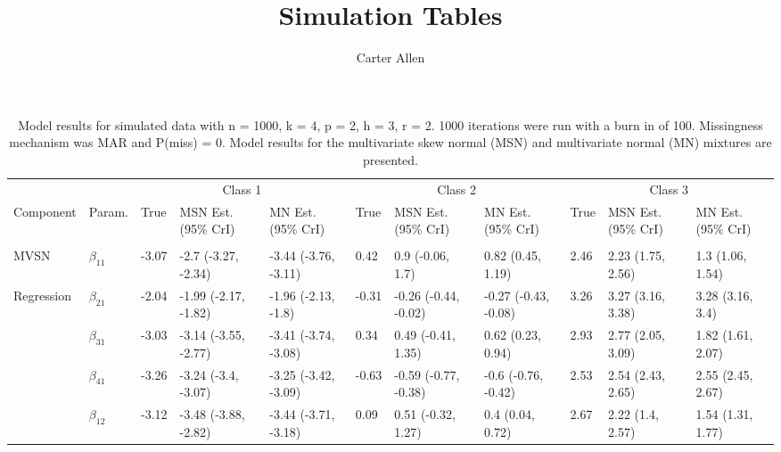\documentclass[]{article}
\title{Simulation Tables}
\author{Carter Allen}
\date{}
\begin{document}
\maketitle

\begin{landscape}\begin{table}[t]

\caption{\label{tab:unnamed-chunk-4}Model results for simulated data with n = 1000, k = 4, p = 2, h = 3, r = 2. 1000 iterations were run with a burn in of 100. Missingness mechanism was MAR and P(miss) = 0. Model results for the multivariate skew normal (MSN) and multivariate normal (MN) mixtures are presented.}
\centering
\fontsize{7}{9}\selectfont
\begin{tabular}{lllllllllll}
\toprule
\multicolumn{2}{c}{ } & \multicolumn{3}{c}{Class 1} & \multicolumn{3}{c}{Class 2} & \multicolumn{3}{c}{Class 3} \\
\cmidrule(l{3pt}r{3pt}){3-5} \cmidrule(l{3pt}r{3pt}){6-8} \cmidrule(l{3pt}r{3pt}){9-11}
Component & Param. & True & MSN Est. (95\% CrI) & MN Est. (95\% CrI)  & True & MSN Est. (95\% CrI) & MN Est. (95\% CrI) & True & MSN Est. (95\% CrI) & MN Est. (95\% CrI)\\
\midrule
\addlinespace[0.3em]
\multicolumn{11}{l}{\textbf{ }}\\
\hspace{1em}MVSN & $\beta_{11}$ & -3.07 & -2.7 (-3.27, -2.34) & -3.44 (-3.76, -3.11) & 0.42 & 0.9 (-0.06, 1.7) & 0.82 (0.45, 1.19) & 2.46 & 2.23 (1.75, 2.56) & 1.3 (1.06, 1.54)\\
\hspace{1em}Regression & $\beta_{21}$ & -2.04 & -1.99 (-2.17, -1.82) & -1.96 (-2.13, -1.8) & -0.31 & -0.26 (-0.44, -0.02) & -0.27 (-0.43, -0.08) & 3.26 & 3.27 (3.16, 3.38) & 3.28 (3.16, 3.4)\\
\hspace{1em} & $\beta_{31}$ & -3.03 & -3.14 (-3.55, -2.77) & -3.41 (-3.74, -3.08) & 0.34 & 0.49 (-0.41, 1.35) & 0.62 (0.23, 0.94) & 2.93 & 2.77 (2.05, 3.09) & 1.82 (1.61, 2.07)\\
\hspace{1em} & $\beta_{41}$ & -3.26 & -3.24 (-3.4, -3.07) & -3.25 (-3.42, -3.09) & -0.63 & -0.59 (-0.77, -0.38) & -0.6 (-0.76, -0.42) & 2.53 & 2.54 (2.43, 2.65) & 2.55 (2.45, 2.67)\\
\hspace{1em} & $\beta_{12}$ & -3.12 & -3.48 (-3.88, -2.82) & -3.44 (-3.71, -3.18) & 0.09 & 0.51 (-0.32, 1.27) & 0.4 (0.04, 0.72) & 2.67 & 2.22 (1.4, 2.57) & 1.54 (1.31, 1.77)\\

\end{tabular}
\end{table}
\end{landscape}
\end{document}
